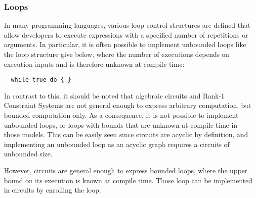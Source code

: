 \subsubsection{Loops} In many programming languages, various loop control structures are defined that allow developers to execute expressions with a specified number of repetitions or arguments. In particular, it is often possible to implement unbounded loops like the loop structure give below, where the number of executions depends on execution inputs and is therefore unknown at compile time:
\begin{lstlisting}
  while true do { }
\end{lstlisting}


In contrast to this, it should be noted that algebraic circuits and Rank-1 Constraint Systems are not general enough to express arbitrary computation, but bounded computation only. As a consequence,  it is not possible to implement unbounded loops, or loops with bounds that are unknown at compile time in those models. This can be easily seen since circuits are acyclic by definition, and implementing an unbounded loop as an acyclic graph requires a circuits of unbounded size. 

However, circuits are general enough to express bounded loops, where the upper bound on its execution is known at compile time. Those loop can be implemented in circuits by enrolling the loop. 

